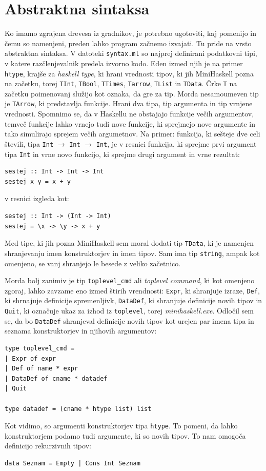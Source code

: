 \documentclass[a4paper,12pt,openright]{book}
\begin{document}
\section{Abstraktna sintaksa}
Ko imamo zgrajena drevesa iz gradnikov, je potrebno ugotoviti, kaj pomenijo in čemu so namenjeni, preden lahko program začnemo izvajati. Tu pride na vrsto abstraktna sintaksa. 
V datoteki \lstinline{syntax.ml} so najprej definirani podatkovni tipi, v katere razčlenjevalnik predela izvorno kodo. Eden izmed njih je na primer 
\lstinline{htype}, krajše za \textit{haskell type}, ki hrani vrednosti tipov, ki jih MiniHaskell pozna na začetku, torej \lstinline{TInt}, \lstinline{TBool}, \lstinline{TTimes}, \lstinline{Tarrow}, \lstinline{TList} in 
\lstinline{TData}. Črke \lstinline{T} na začetku poimenovanj služijo kot oznaka, da gre za tip. Morda nesamoumeven tip je \lstinline{TArrow}, ki predstavlja funkcije. Hrani dva tipa, tip argumenta
in tip vrnjene vrednosti. Spomnimo se, da v Haskellu ne obstajajo funkcije večih argumentov, temveč funkcije lahko vrnejo tudi nove funkcije, ki sprejmejo nove argumente in tako 
simulirajo sprejem večih argumetnov. Na primer: funkcija, ki sešteje dve celi števili, tipa \lstinline{Int} $\rightarrow$ \lstinline{Int} $\rightarrow$ \lstinline{Int}, je v resnici funkcija, ki sprejme prvi argument tipa \lstinline{Int}
in vrne novo funkcijo, ki sprejme drugi argument in vrne rezultat:
\begin{lstlisting}
sestej :: Int -> Int -> Int
sestej x y = x + y
\end{lstlisting}
v resnici izgleda kot:
\begin{lstlisting}
sestej :: Int -> (Int -> Int)
sestej = \x -> \y -> x + y
\end{lstlisting}
Med tipe, ki jih pozna MiniHaskell sem moral dodati tip \lstinline{TData}, ki je namenjen shranjevanju imen konstruktorjev in imen tipov. Sam ima tip \lstinline{string}, ampak kot omenjeno, 
se vanj shranjejo le besede z veliko začetnico. 

Morda bolj zanimiv je tip \lstinline{toplevel_cmd} ali \textit{toplevel command}, ki kot omenjeno zgoraj, lahko zavzame eno izmed štirih vrendnosti: \lstinline{Expr}, ki shranjuje izraze, 
\lstinline{Def}, ki shrnajuje definicije spremenljivk, \lstinline{DataDef}, ki shranjuje definicije novih tipov in \lstinline{Quit}, ki označuje ukaz za izhod iz \lstinline{toplevel}, torej 
\emph{minihaskell.exe}. Odločil sem se, da bo \lstinline{DataDef} shranjeval definicije novih tipov kot urejen par imena tipa in seznama konstruktorjev in njihovih argumentov:
\begin{lstlisting}
type toplevel_cmd =
| Expr of expr
| Def of name * expr
| DataDef of cname * datadef
| Quit

type datadef = (cname * htype list) list
\end{lstlisting}
Kot vidimo, so argumenti konstruktorjev tipa \lstinline{htype}. To pomeni, da lahko konstruktorjem podamo tudi argumente, ki so novih tipov. To nam omogoča definicijo rekurzivnih tipov:
\begin{lstlisting}
data Seznam = Empty | Cons Int Seznam
\end{lstlisting}
\end{document}
